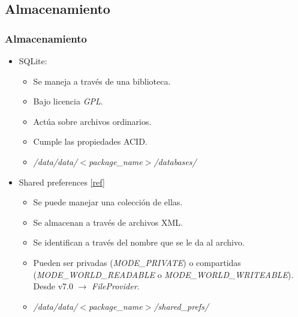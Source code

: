 \subsection{Almacenamiento}
\begin{frame}
  \frametitle{Almacenamiento}
  \begin{itemize}
      \item SQLite: 
      \begin{itemize}
    \item Se maneja a través de una biblioteca.
    
    \item Bajo licencia \textit{GPL}.
    
    \item Actúa sobre archivos ordinarios.

    \item Cumple las propiedades ACID.
    
    \item \textit{/data/data/$<$package\_name$>$/databases/}
      \end{itemize}
      
      \item Shared preferences \href{https://developer.android.com/guide/topics/data/data-storage.html}{[ref]}
      \begin{itemize}
    \item Se puede manejar una colección de ellas.
    
    \item Se almacenan a través de archivos XML.
    
    \item Se identifican a través del nombre que se le da al archivo.
    
    \item Pueden ser privadas (\textit{MODE\_PRIVATE}) o compartidas (\textit{MODE\_WORLD\_READABLE} o \textit{MODE\_WORLD\_WRITEABLE}). Desde v7.0 $\rightarrow$ \textit{FileProvider}.
    
    \item \textit{/data/data/$<$package\_name$>$/shared\_prefs/}
      \end{itemize}
  \end{itemize}
\end{frame}


